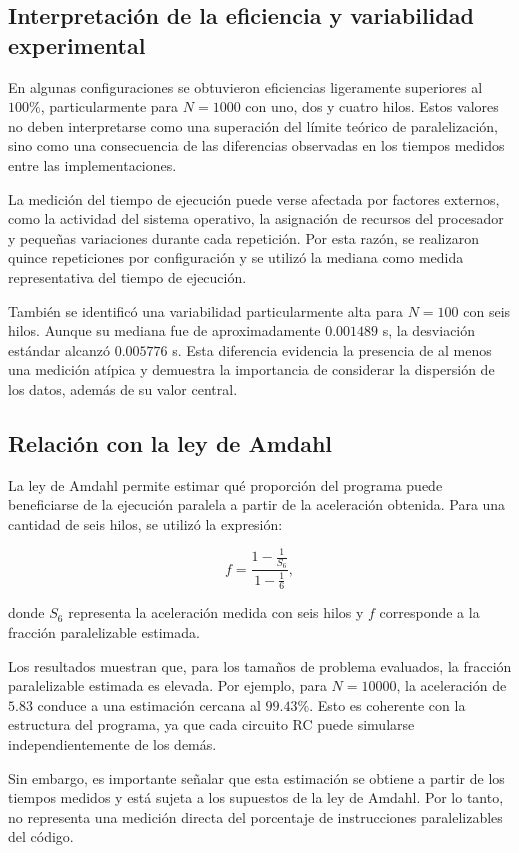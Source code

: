 \documentclass[11pt,a4paper]{article}
\begin{document}
\subsection{Interpretación de la eficiencia y variabilidad experimental}

En algunas configuraciones se obtuvieron eficiencias ligeramente superiores al $100\%$, particularmente para $N=1000$ con uno, dos y cuatro hilos. Estos valores no deben interpretarse como una superación del límite teórico de paralelización, sino como una consecuencia de las diferencias observadas en los tiempos medidos entre las implementaciones.

La medición del tiempo de ejecución puede verse afectada por factores externos, como la actividad del sistema operativo, la asignación de recursos del procesador y pequeñas variaciones durante cada repetición. Por esta razón, se realizaron quince repeticiones por configuración y se utilizó la mediana como medida representativa del tiempo de ejecución.

También se identificó una variabilidad particularmente alta para $N=100$ con seis hilos. Aunque su mediana fue de aproximadamente $0.001489$ s, la desviación estándar alcanzó $0.005776$ s. Esta diferencia evidencia la presencia de al menos una medición atípica y demuestra la importancia de considerar la dispersión de los datos, además de su valor central.

\subsection{Relación con la ley de Amdahl}

La ley de Amdahl permite estimar qué proporción del programa puede beneficiarse de la ejecución paralela a partir de la aceleración obtenida. Para una cantidad de seis hilos, se utilizó la expresión:

\[
f = \frac{1-\frac{1}{S_6}}{1-\frac{1}{6}},
\]

donde $S_6$ representa la aceleración medida con seis hilos y $f$ corresponde a la fracción paralelizable estimada.

Los resultados muestran que, para los tamaños de problema evaluados, la fracción paralelizable estimada es elevada. Por ejemplo, para $N=10000$, la aceleración de $5.83$ conduce a una estimación cercana al $99.43\%$. Esto es coherente con la estructura del programa, ya que cada circuito RC puede simularse independientemente de los demás.

Sin embargo, es importante señalar que esta estimación se obtiene a partir de los tiempos medidos y está sujeta a los supuestos de la ley de Amdahl. Por lo tanto, no representa una medición directa del porcentaje de instrucciones paralelizables del código.
\end{document}
